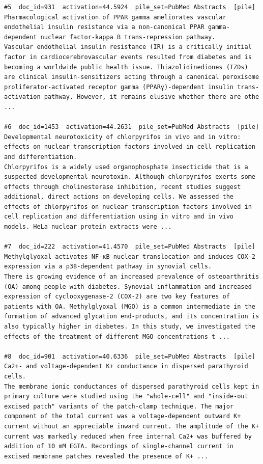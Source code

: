 \begin{verbatim}
#5  doc_id=931  activation=44.5924  pile_set=PubMed Abstracts  [pile]
Pharmacological activation of PPAR gamma ameliorates vascular endothelial insulin resistance via a non-canonical PPAR gamma-dependent nuclear factor-kappa B trans-repression pathway.
Vascular endothelial insulin resistance (IR) is a critically initial factor in cardiocerebrovascular events resulted from diabetes and is becoming a worldwide public health issue. Thiazolidinediones (TZDs) are clinical insulin-sensitizers acting through a canonical peroxisome proliferator-activated receptor gamma (PPARγ)-dependent insulin trans-activation pathway. However, it remains elusive whether there are othe ...

#6  doc_id=1453  activation=44.2631  pile_set=PubMed Abstracts  [pile]
Developmental neurotoxicity of chlorpyrifos in vivo and in vitro: effects on nuclear transcription factors involved in cell replication and differentiation.
Chlorpyrifos is a widely used organophosphate insecticide that is a suspected developmental neurotoxin. Although chlorpyrifos exerts some effects through cholinesterase inhibition, recent studies suggest additional, direct actions on developing cells. We assessed the effects of chlorpyrifos on nuclear transcription factors involved in cell replication and differentiation using in vitro and in vivo models. HeLa nuclear protein extracts were ...

#7  doc_id=222  activation=41.4570  pile_set=PubMed Abstracts  [pile]
Methylglyoxal activates NF-κB nuclear translocation and induces COX-2 expression via a p38-dependent pathway in synovial cells.
There is growing evidence of an increased prevalence of osteoarthritis (OA) among people with diabetes. Synovial inflammation and increased expression of cyclooxygenase-2 (COX-2) are two key features of patients with OA. Methylglyoxal (MGO) is a common intermediate in the formation of advanced glycation end-products, and its concentration is also typically higher in diabetes. In this study, we investigated the effects of the treatment of different MGO concentrations t ...

#8  doc_id=901  activation=40.6336  pile_set=PubMed Abstracts  [pile]
Ca2+- and voltage-dependent K+ conductance in dispersed parathyroid cells.
The membrane ionic conductances of dispersed parathyroid cells kept in primary culture were studied using the "whole-cell" and "inside-out excised patch" variants of the patch-clamp technique. The major component of the total current was a voltage-dependent outward K+ current without an appreciable inward current. The amplitude of the K+ current was markedly reduced when free internal Ca2+ was buffered by addition of 10 mM EGTA. Recordings of single-channel current in excised membrane patches revealed the presence of K+ ...


\end{verbatim}
